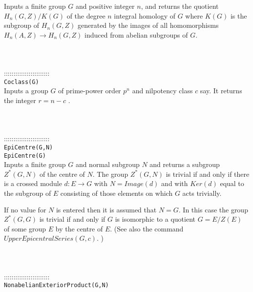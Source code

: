 \documentclass[a4paper,11pt]{report}
\begin{document}
{ Inputs a finite group $G$ and positive integer $n$, and returns the quotient $H_n(G,Z)/K(G)$ of the degree $n$ integral homology of $G$ where $K(G)$ is the subgroup of $H_n(G,Z)$ generated by the images of all homomorphisms $H_n(A,Z) \rightarrow H_n(G,Z)$ induced from abelian subgroups of $G$. \\
 \\
 \\
 \\
 ::::::::::::::::::::::::\\
 \texttt{Coclass(G) }\\
 

 Inputs a group $G$ of prime-power order $p^n$ and nilpotency class $c$ say. It returns the integer $r=n-c$ . \\
 \\
 \\
 \\
 ::::::::::::::::::::::::\\
 \texttt{EpiCentre(G,N) }\\
 \texttt{EpiCentre(G)}\\
 

 Inputs a finite group $G$ and normal subgroup $N$ and returns a subgroup $Z^\ast(G,N)$ of the centre of $N$. The group $Z^\ast(G,N)$ is trivial if and only if there is a crossed module $d:E \longrightarrow G$ with $N=Image(d)$ and with $Ker(d)$ equal to the subgroup of $E$ consisting of those elements on which $G$ acts trivially. 

 If no value for $N$ is entered then it is assumed that $N=G$. In this case the group $Z^\ast(G,G)$ is trivial if and only if $G$ is isomorphic to a quotient $G=E/Z(E)$ of some group $E$ by the centre of $E$. (See also the command $UpperEpicentralSeries(G,c)$. ) \\
 \\
 \\
 \\
 ::::::::::::::::::::::::\\
 \texttt{NonabelianExteriorProduct(G,N) }\\
 

}
\end{document}
